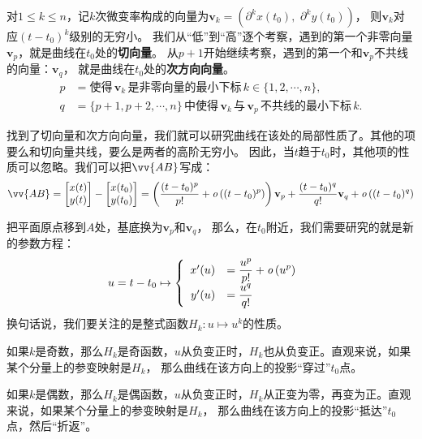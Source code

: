 \documentclass[12pt,UTF8]{ctexbook}
\begin{document}
对$1\leqslant k\leqslant n$，记$k$次微变率构成的向量为$\mathbf{v}_k = (\partial^k x(t_0) ,\,\, \partial^k y(t_0))$，
则$\mathbf{v}_k$对应$(t - t_0)^k$级别的无穷小。
我们从“低”到“高”逐个考察，遇到的第一个非零向量$\mathbf{v}_p$，就是曲线在$t_0$处的\textbf{切向量}。
从$p+1$开始继续考察，遇到的第一个和$\mathbf{v}_p$不共线的向量：$\mathbf{v}_q$，
就是曲线在$t_0$处的\textbf{次方向向量}。
\begin{align*}
    p &= \mbox{使得}\,\mathbf{v}_k\,\mbox{是非零向量的最小下标}\,k\in\{1,2,\cdots, n\}, \\
    q &= \{p+1,p+2,\cdots, n\}\,\mbox{中使得}\,\mathbf{v}_k\,\mbox{与}\,\mathbf{v}_p\,\mbox{不共线的最小下标}\, k. 
\end{align*}

找到了切向量和次方向向量，我们就可以研究曲线在该处的局部性质了。其他的项要么和切向量共线，要么是两者的高阶无穷小。
因此，当$t$趋于$t_0$时，其他项的性质可以忽略。我们可以把$\vv{AB}$写成：
$$
\vv{AB} = \begin{bmatrix} x(t) \\ y(t) \end{bmatrix} - \begin{bmatrix} x(t_0) \\ y(t_0) \end{bmatrix}
=
\left(\frac{(t - t_0)^p}{p!} + \olim{(t - t_0)^p}\right)\mathbf{v}_p
+
\frac{(t - t_0)^q}{q!}\mathbf{v}_q
+
\olim{(t - t_0)^q}
$$

把平面原点移到$A$处，基底换为$\mathbf{v}_p$和$\mathbf{v}_q$，
那么，在$t_0$附近，我们需要研究的就是新的参数方程：
\begin{align*}
    u = t - t_0 &\mapsto\left\{
        \begin{array}[]{rl}
            x'(u) &\displaystyle = \frac{u^p}{p!} + \olim{u^p} \\
            y'(u) &\displaystyle = \frac{u^q}{q!} \\
        \end{array}
    \right.
\end{align*}
换句话说，我们要关注的是整式函数$H_k: u\mapsto u^k$的性质。

如果$k$是奇数，那么$H_k$是奇函数，$u$从负变正时，$H_k$也从负变正。直观来说，如果某个分量上的参变映射是$H_k$，
那么曲线在该方向上的投影“穿过”$t_0$点。

如果$k$是偶数，那么$H_k$是偶函数，$u$从负变正时，$H_k$从正变为零，再变为正。直观来说，如果某个分量上的参变映射是$H_k$，
那么曲线在该方向上的投影“抵达”$t_0$点，然后“折返”。
\end{document}
